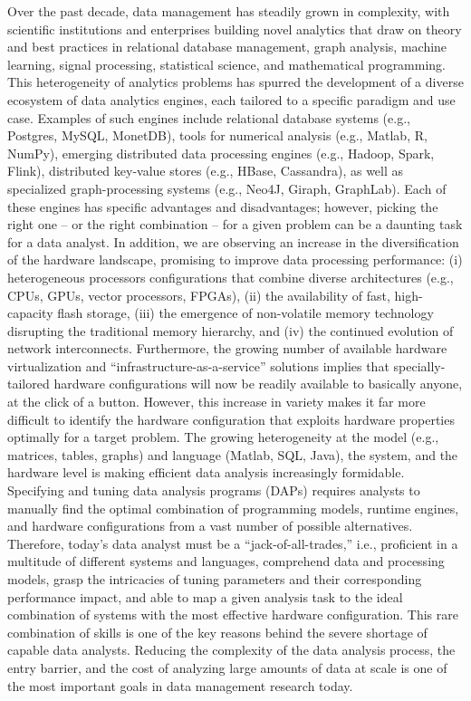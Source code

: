 \documentclass[a4paper,UKenglish]{dagrep-v2018}
\begin{document}
\license




Over the past decade, data management has steadily grown in complexity, with scientific institutions and enterprises building novel analytics that draw on theory and best practices in relational database management, graph analysis, machine learning, signal processing, statistical science, and mathematical programming. This heterogeneity of analytics problems has spurred the development of a diverse ecosystem of data analytics engines, each tailored to a specific paradigm and use case. Examples of such engines include relational database systems (e.g., Postgres, MySQL, MonetDB), tools for numerical analysis (e.g., Matlab, R, NumPy), emerging distributed data processing engines (e.g., Hadoop, Spark, Flink), distributed key-value stores (e.g., HBase, Cassandra), as well as specialized graph-processing systems (e.g., Neo4J, Giraph, GraphLab). Each of these engines has specific advantages and disadvantages; however, picking the right one -- or the right combination -- for a given problem can be a daunting task for a data analyst.
In addition, we are observing an increase in the diversification of the hardware landscape, promising to improve data processing performance: (i) heterogeneous processors configurations that combine diverse architectures (e.g., CPUs, GPUs, vector processors, FPGAs), (ii) the availability of fast, high-capacity flash storage, (iii) the emergence of non-volatile memory technology disrupting the traditional memory hierarchy, and (iv) the continued evolution of network interconnects. Furthermore, the growing number of available hardware virtualization and ``infrastructure-as-a-service'' solutions implies that specially-tailored hardware configurations will now be readily available to basically anyone, at the click of a button. However, this increase in variety makes it far more difficult to identify the hardware configuration that exploits hardware properties optimally for a target problem.
The growing heterogeneity at the model (e.g., matrices, tables, graphs) and language (Matlab, SQL, Java), the system, and the hardware level is making efficient data analysis increasingly formidable. Specifying and tuning data analysis programs (DAPs) requires analysts to manually find the optimal combination of programming models, runtime engines, and hardware configurations from a vast number of possible alternatives. Therefore, today’s data analyst must be a ``jack-of-all-trades,'' i.e., proficient in a multitude of different systems and languages, comprehend data and processing models, grasp the intricacies of tuning parameters and their corresponding performance impact, and able to map a given analysis task to the ideal combination of systems with the most effective hardware configuration. This rare combination of skills is one of the key reasons behind the severe shortage of capable data analysts. Reducing the complexity of the data analysis process, the entry barrier, and the cost of analyzing large amounts of data at scale is one of the most important goals in data management research today.
\end{document}
